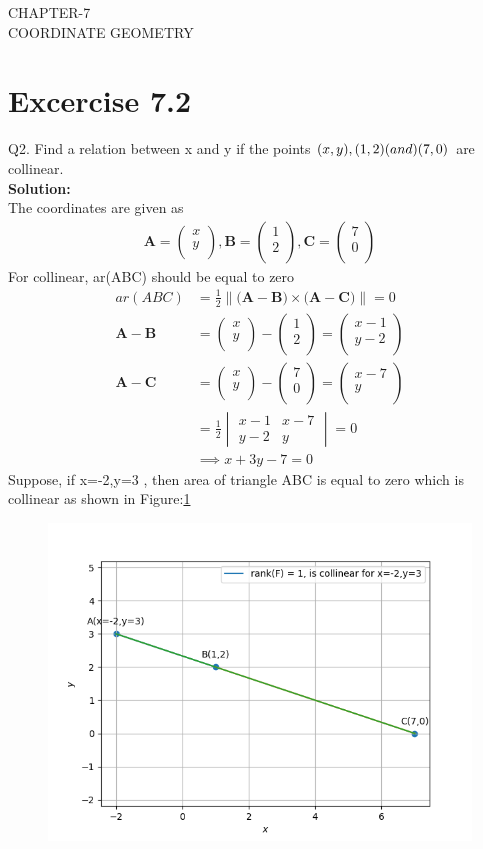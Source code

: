 \documentclass[12pt]{article}
\newcommand{\mydet}[1]{\ensuremath{\begin{vmatrix}#1\end{vmatrix}}}
\providecommand{\norm}[1]{\left\lVert#1\right\rVert}
\newcommand{\solution}{\noindent \textbf{Solution: }}
\newcommand{\myvec}[1]{\ensuremath{\begin{pmatrix}#1\end{pmatrix}}}
\let\vec\mathbf
\begin{document}
\begin{center}
\textbf\large{CHAPTER-7 \\ COORDINATE GEOMETRY}
\end{center}
\section*{Excercise 7.2}

Q2. Find a relation between x and y if the points $\vec(x, y), \vec(1, 2) \text( and ) \vec(7, 0)$ are collinear.
\\
\solution
\\
The coordinates are given as
	\begin{align}
	\vec{A} = \myvec{
		x\\
		y\\
		},
	\vec{B} = \myvec{
		1\\
		2\\
		},
	\vec{C} = \myvec{
		7\\
		0\\
		}
	\end{align}
For collinear, ar(ABC) should be equal to zero
	\begin{align}
		ar(ABC)&=\frac{1}{2}{\norm{\vec(\vec{A}-\vec{B})\times\vec(\vec{A}-\vec{C})}}=0\\
		\vec{A}-\vec{B} &=  \myvec{
  x \\
  y \\
 } - \myvec{
  1 \\
  2 \\
 } = \myvec{
 x-1 \\
 y-2 \\
 }
 \\
		\vec{A}-\vec{C} &=  \myvec{
  x \\
  y \\
 } - \myvec{
  7 \\
  0 \\
 } = \myvec{
 x-7 \\
 y \\
 }
 \\
		&=\frac{1}{2}\mydet{x-1 & x-7\\y-2 & y}=0\\
		&\implies x+3y-7=0
	\end{align}
	Suppose, if x=-2,y=3 , then area of triangle ABC is equal to zero which is collinear as shown in Figure:\ref{fig:Fig}
\begin{figure}[!h]
	\begin{center} 
	    \includegraphics[width=\columnwidth]{./figs/sc1.png}
	\end{center}
\caption{}
\label{fig:Fig}
\end{figure}
\end{document}
